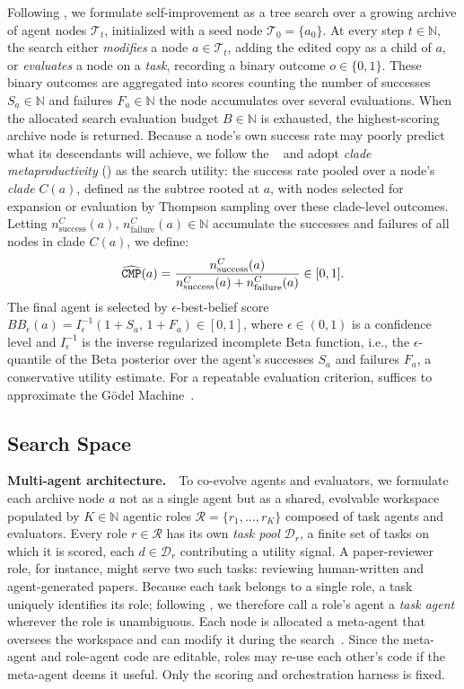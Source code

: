 Following \citet{wang2025huxley}, we formulate self-improvement as a tree search over a growing archive of agent nodes $\mathcal{T}_t$, initialized with a seed node $\mathcal{T}_0=\{a_0\}$. At every step $t\in\mathbb{N}$, the search either \emph{modifies} a node $a\in\mathcal{T}_t$, adding the edited copy as a child of $a$, or \emph{evaluates} a node on a \emph{task}, recording a binary outcome $o\in\{0,1\}$. These binary outcomes are aggregated into scores counting the number of successes $S_a \in \mathbb{N}$ and failures $F_a \in \mathbb{N}$ the node accumulates over several evaluations. When the allocated search evaluation budget $B \in \mathbb{N}$ is exhausted, the highest-scoring archive node is returned. Because a node's own success rate may poorly predict what its descendants will achieve, we follow the \hgm~\citep{wang2025huxley} and adopt \emph{clade metaproductivity} (\cmp) as the search utility: the success rate pooled over a node's \emph{clade} $C(a)$, defined as the subtree rooted at $a$, with nodes selected for expansion or evaluation by Thompson sampling over these clade-level outcomes. Letting $n_{\mathrm{success}}^{C}(a),\,n_{\mathrm{failure}}^{C}(a)\in\mathbb{N}$ accumulate the successes and failures of all nodes in clade $C(a)$, we define:
\[
\widehat{\texttt{CMP}}(a)
=
\frac{n_{\mathrm{success}}^{C}(a)}{n_{\mathrm{success}}^{C}(a)+n_{\mathrm{failure}}^{C}(a)} \in [0,1].
\]
The final agent is selected by $\epsilon$-best-belief score $BB_\epsilon(a)=I^{-1}_{\epsilon}\!\left(1+S_a,\,1+F_a\right)\in[0,1]$, where $\epsilon\in(0,1)$ is a confidence level and $I^{-1}_{\epsilon}$ is the inverse regularized incomplete Beta function, i.e., the $\epsilon$-quantile of the Beta posterior over the agent's successes $S_a$ and failures $F_a$, a conservative utility estimate. For a repeatable evaluation criterion, \cmp suffices to approximate the G\"odel Machine~\citep{wang2025huxley}.

\subsection{Search Space}
\label{sec:method:multiagent}

\noindent\textbf{Multi-agent architecture.}~~To co-evolve agents and evaluators, we formulate each archive node $a$ not as a single agent but as a shared, evolvable workspace populated by $K\in\mathbb{N}$ agentic roles $\mathcal{R}=\{r_1,\ldots,r_K\}$ composed of task agents and evaluators. Every role $r\in\mathcal{R}$ has its own \emph{task pool} $\mathcal{D}_r$, a finite set of tasks on which it is scored, each $d\in\mathcal{D}_r$ contributing a utility signal. A paper-reviewer role, for instance, might serve two such tasks: reviewing human-written and agent-generated papers. Because each task belongs to a single role, a task uniquely identifies its role; following \hyperagents, we therefore call a role's agent a \emph{task agent} wherever the role is unambiguous. Each node is allocated a meta-agent that oversees the workspace and can modify it during the search~\citep{zhang2026hyperagents}. Since the meta-agent and role-agent code are editable, roles may re-use each other's code if the meta-agent deems it useful. Only the scoring and orchestration harness is fixed.

